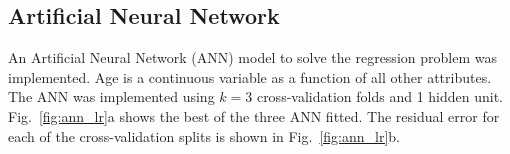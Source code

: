 \documentclass[10pt, paper=a4]{article}
\begin{document}

\subsection{Artificial Neural Network}
An Artificial Neural Network (ANN) model to solve the regression
problem was implemented.  Age is a continuous variable as a function of
all other attributes. The ANN was implemented using $k=3$
cross-validation folds and 1 hidden unit. Fig.~\ref{fig:ann_lr}a
shows the best of the three ANN fitted. The residual error for each
of the cross-validation splits is shown in Fig.~\ref{fig:ann_lr}b.

\end{document}

